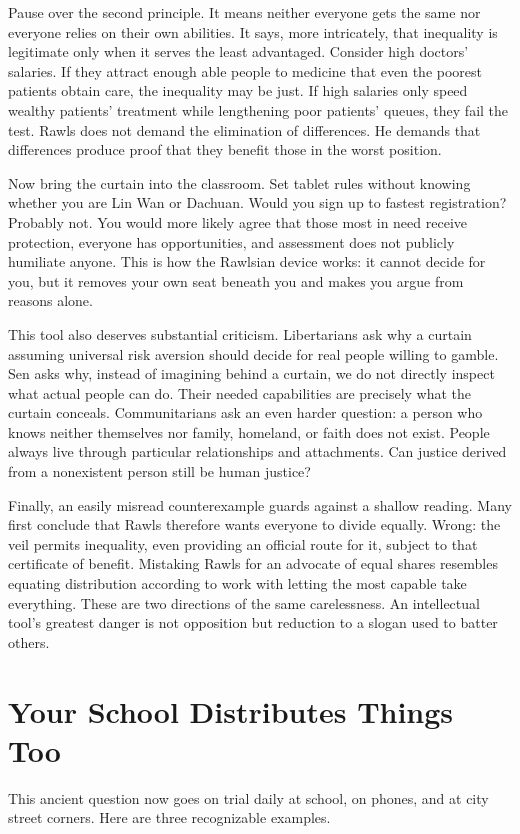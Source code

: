 Pause over the second principle. It means neither everyone gets the same nor everyone relies on their own abilities. It says, more intricately, that inequality is legitimate only when it serves the least advantaged. Consider high doctors' salaries. If they attract enough able people to medicine that even the poorest patients obtain care, the inequality may be just. If high salaries only speed wealthy patients' treatment while lengthening poor patients' queues, they fail the test. Rawls does not demand the elimination of differences. He demands that differences produce proof that they benefit those in the worst position.

Now bring the curtain into the classroom. Set tablet rules without knowing whether you are Lin Wan or Dachuan. Would you sign up to fastest registration? Probably not. You would more likely agree that those most in need receive protection, everyone has opportunities, and assessment does not publicly humiliate anyone. This is how the Rawlsian device works: it cannot decide for you, but it removes your own seat beneath you and makes you argue from reasons alone.

This tool also deserves substantial criticism. Libertarians ask why a curtain assuming universal risk aversion should decide for real people willing to gamble. Sen asks why, instead of imagining behind a curtain, we do not directly inspect what actual people can do. Their needed capabilities are precisely what the curtain conceals. Communitarians ask an even harder question: a person who knows neither themselves nor family, homeland, or faith does not exist. People always live through particular relationships and attachments. Can justice derived from a nonexistent person still be human justice?

Finally, an easily misread counterexample guards against a shallow reading. Many first conclude that Rawls therefore wants everyone to divide equally. Wrong: the veil permits inequality, even providing an official route for it, subject to that certificate of benefit. Mistaking Rawls for an advocate of equal shares resembles equating distribution according to work with letting the most capable take everything. These are two directions of the same carelessness. An intellectual tool's greatest danger is not opposition but reduction to a slogan used to batter others.

\section{Your School Distributes Things Too}
This ancient question now goes on trial daily at school, on phones, and at city street corners. Here are three recognizable examples.

